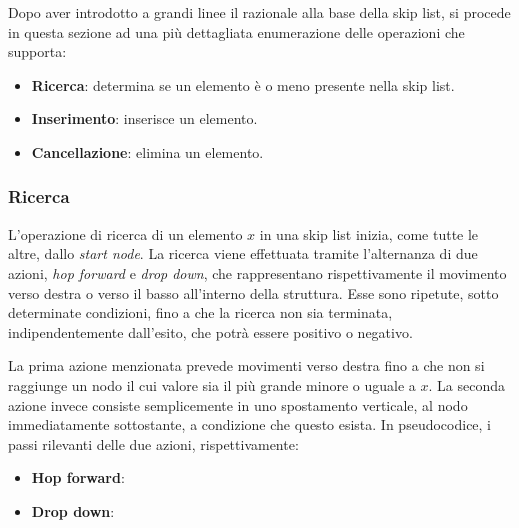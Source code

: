 		Dopo aver introdotto a grandi linee il razionale alla base della skip list, si procede in questa sezione ad una più dettagliata enumerazione delle operazioni che supporta:
		\begin{itemize} 
			\item \textbf{Ricerca}: determina se un elemento è o meno presente nella skip list.
			\item \textbf{Inserimento}: inserisce un elemento.
			\item \textbf{Cancellazione}: elimina un elemento.
		\end{itemize} 
	
		\subsubsection{Ricerca}
			
			L'operazione di ricerca di un elemento $ x $ in una skip list inizia, come tutte le altre, dallo \textit{start node}. La ricerca viene effettuata tramite l'alternanza di due azioni, \textit{hop forward} e \textit{drop down}, che rappresentano rispettivamente il movimento verso destra o verso il basso all'interno della struttura. Esse sono ripetute, sotto determinate condizioni, fino a che la ricerca non sia terminata, indipendentemente dall'esito, che potrà essere positivo o negativo.
			
			La prima azione menzionata prevede movimenti verso destra fino a che non si raggiunge un nodo il cui valore sia il più grande minore o uguale a $ x $. La seconda azione invece consiste semplicemente in uno spostamento verticale, al nodo immediatamente sottostante, a condizione che questo esista.  In pseudocodice, i passi rilevanti delle due azioni, rispettivamente: 
			
			\begin{itemize}
			
			\item 
			\textbf{Hop forward}:
				\begin{algorithm}[H]
				\end{algorithm}
			
			\item 
			\textbf{Drop down}:
				\begin{algorithm}[H]
				\end{algorithm}
			\end{itemize} 
			
